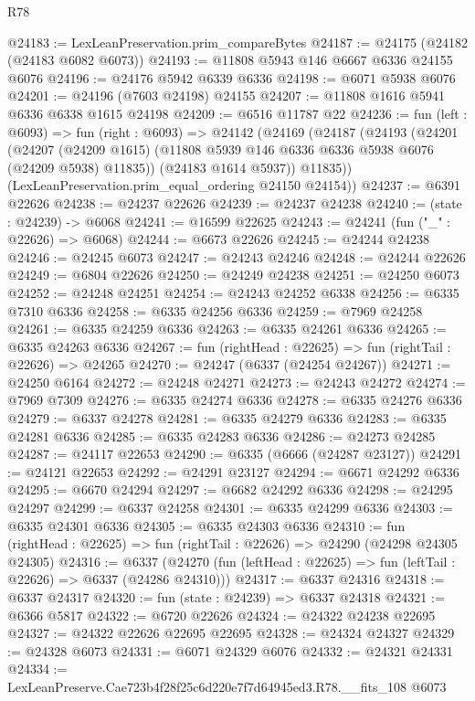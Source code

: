\begin{lexlean}{R78}
\begin{coremodule}
@24183 := LexLeanPreservation.prim_compareBytes
@24187 := @24175 (@24182 (@24183 @6082 @6073))
@24193 := @11808 @5943 @146 @6667 @6336 @24155 @6076
@24196 := @24176 @5942 @6339 @6336
@24198 := @6071 @5938 @6076
@24201 := @24196 (@7603 @24198) @24155
@24207 := @11808 @1616 @5941 @6336 @6338 @1615 @24198
@24209 := @6516 @11787 @22
@24236 := fun (left : @6093) =>
  fun (right : @6093) =>
  @24142
    (@24169
      (@24187
        (@24193
          (@24201
            (@24207
              (@24209 @1615)
              (@11808 @5939 @146 @6336 @6336 @5938 @6076 (@24209 @5938) @11835))
            (@24183 @1614 @5937))
          @11835))
      (LexLeanPreservation.prim_equal_ordering @24150 @24154))
@24237 := @6391 @22626
@24238 := @24237 @22626
@24239 := @24237 @24238
@24240 := (state : @24239) -> @6068
@24241 := @16599 @22625
@24243 := @24241 (fun ("_" : @22626) => @6068)
@24244 := @6673 @22626
@24245 := @24244 @24238
@24246 := @24245 @6073
@24247 := @24243 @24246
@24248 := @24244 @22626
@24249 := @6804 @22626
@24250 := @24249 @24238
@24251 := @24250 @6073
@24252 := @24248 @24251
@24254 := @24243 @24252 @6338
@24256 := @6335 @7310 @6336
@24258 := @6335 @24256 @6336
@24259 := @7969 @24258
@24261 := @6335 @24259 @6336
@24263 := @6335 @24261 @6336
@24265 := @6335 @24263 @6336
@24267 := fun (rightHead : @22625) => fun (rightTail : @22626) => @24265
@24270 := @24247 (@6337 (@24254 @24267))
@24271 := @24250 @6164
@24272 := @24248 @24271
@24273 := @24243 @24272
@24274 := @7969 @7309
@24276 := @6335 @24274 @6336
@24278 := @6335 @24276 @6336
@24279 := @6337 @24278
@24281 := @6335 @24279 @6336
@24283 := @6335 @24281 @6336
@24285 := @6335 @24283 @6336
@24286 := @24273 @24285
@24287 := @24117 @22653
@24290 := @6335 (@6666 (@24287 @23127))
@24291 := @24121 @22653
@24292 := @24291 @23127
@24294 := @6671 @24292 @6336
@24295 := @6670 @24294
@24297 := @6682 @24292 @6336
@24298 := @24295 @24297
@24299 := @6337 @24258
@24301 := @6335 @24299 @6336
@24303 := @6335 @24301 @6336
@24305 := @6335 @24303 @6336
@24310 := fun (rightHead : @22625) => fun (rightTail : @22626) => @24290 (@24298 @24305 @24305)
@24316 := @6337
    (@24270 (fun (leftHead : @22625) => fun (leftTail : @22626) => @6337 (@24286 @24310)))
@24317 := @6337 @24316
@24318 := @6337 @24317
@24320 := fun (state : @24239) => @6337 @24318
@24321 := @6366 @5817
@24322 := @6720 @22626
@24324 := @24322 @24238 @22695
@24327 := @24322 @22626 @22695 @22695
@24328 := @24324 @24327
@24329 := @24328 @6073
@24331 := @6071 @24329 @6076
@24332 := @24321 @24331
@24334 := LexLeanPreserve.Cae723b4f28f25c6d220e7f7d64945ed3.R78.__fits_108 @6073

\end{coremodule}
\end{lexlean}
